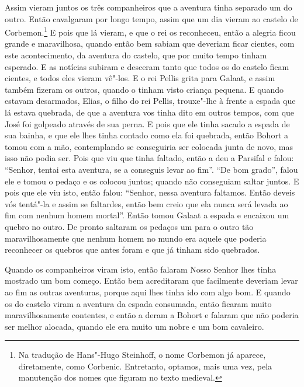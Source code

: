 Assim vieram juntos os três companheiros que a aventura tinha separado um do
outro. Então cavalgaram por longo tempo, assim que um dia vieram ao castelo de
Corbemon.\footnote{ Na tradução de Hans"-Hugo Steinhoff, o nome Corbemon já
aparece, diretamente, como Corbenic. Entretanto, optamos, mais uma vez, pela
manutenção dos nomes que figuram no texto medieval.} E pois que lá
vieram, e que o rei os reconheceu, então a alegria ficou grande e maravilhosa,
quando então bem sabiam que deveriam ficar cientes, com este acontecimento, da
aventura do castelo, que por muito tempo tinham esperado. E as notícias subiram
e desceram tanto que todos os do castelo ficam cientes, e todos eles vieram
vê"-los. E o rei Pellis grita para Galaat, e assim também fizeram os outros,
quando o tinham visto criança pequena. E quando estavam desarmados, Elias, o
filho do rei Pellis, trouxe"-lhe à frente a espada que lá estava quebrada, de
que a aventura vos tinha dito em outros tempos,  com que José foi
golpeado através de sua perna. E pois que ele tinha sacado a espada de sua
bainha, e que ele lhes tinha contado como ela foi quebrada, então Bohort a
tomou com a mão, contemplando se conseguiria ser colocada junta de novo, mas
isso não podia ser. Pois que viu que tinha faltado, então a deu a Parsifal e
falou: “Senhor, tentai esta aventura, se a conseguis levar ao fim”. “De bom
grado”, falou ele e tomou o pedaço e os colocou juntos; quando não conseguiam
saltar juntos. E pois que ele viu isto, então falou: “Senhor, nessa aventura
faltamos. Então deveis vós tentá"-la e assim se faltardes, então bem creio que
ela nunca será levada ao fim com nenhum homem mortal”. Então tomou Galaat a
espada e encaixou um quebro no outro. De pronto saltaram os pedaços um para o
outro tão maravilhosamente que nenhum homem no mundo era aquele que poderia
reconhecer os quebros que antes foram e que já tinham sido quebrados.

Quando os companheiros viram isto, então falaram Nosso Senhor lhes tinha
mostrado um bom começo. Então bem acreditaram que facilmente deveriam levar ao
fim as outras aventuras, porque aqui lhes tinha ido com algo bom. E quando os
do castelo viram a aventura da espada consumada, então ficaram muito
maravilhosamente contentes, e então a deram a Bohort e falaram que não poderia
ser melhor alocada, quando ele era muito um nobre e um bom cavaleiro.


